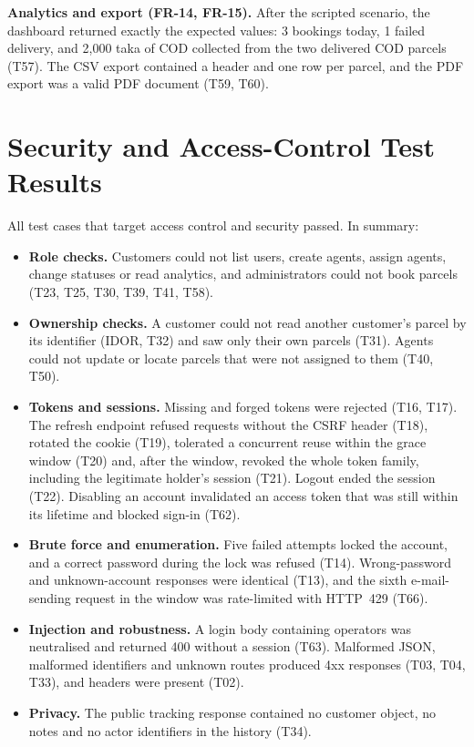 \textbf{Analytics and export (FR-14, FR-15).} After the scripted scenario, the dashboard returned exactly the expected values: 3 bookings today, 1 failed delivery, and 2,000 taka of COD collected from the two delivered COD parcels (T57). The CSV export contained a header and one row per parcel, and the PDF export was a valid PDF document (T59, T60).

\section{Security and Access-Control Test Results}
\label{sec:sec-tests}

All test cases that target access control and security passed. In summary:

\begin{itemize}
  \item \textbf{Role checks.} Customers could not list users, create agents, assign agents, change statuses or read analytics, and administrators could not book parcels (T23, T25, T30, T39, T41, T58).
  \item \textbf{Ownership checks.} A customer could not read another customer's parcel by its identifier (IDOR, T32) and saw only their own parcels (T31). Agents could not update or locate parcels that were not assigned to them (T40, T50).
  \item \textbf{Tokens and sessions.} Missing and forged tokens were rejected (T16, T17). The refresh endpoint refused requests without the CSRF header (T18), rotated the cookie (T19), tolerated a concurrent reuse within the grace window (T20) and, after the window, revoked the whole token family, including the legitimate holder's session (T21). Logout ended the session (T22). Disabling an account invalidated an access token that was still within its lifetime and blocked sign-in (T62).
  \item \textbf{Brute force and enumeration.} Five failed attempts locked the account, and a correct password during the lock was refused (T14). Wrong-password and unknown-account responses were identical (T13), and the sixth e-mail-sending request in the window was rate-limited with HTTP~429 (T66).
  \item \textbf{Injection and robustness.} A login body containing  operators was neutralised and returned 400 without a session (T63). Malformed JSON, malformed identifiers and unknown routes produced 4xx responses (T03, T04, T33), and  headers were present (T02).
  \item \textbf{Privacy.} The public tracking response contained no customer object, no notes and no actor identifiers in the history (T34).
\end{itemize}

